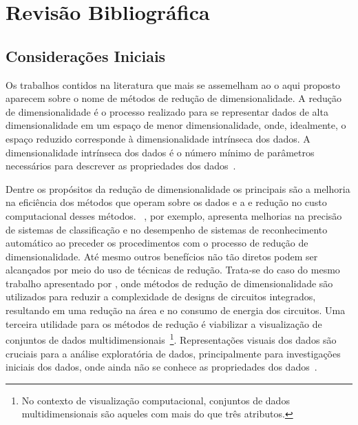 \chapter{Revisão Bibliográfica}\label{chap:revisao}

\section{Considerações Iniciais}


Os trabalhos contidos na literatura que mais se assemelham ao o aqui proposto aparecem sobre o nome de métodos de redução de dimensionalidade. 
A redução de dimensionalidade é o processo realizado para se representar dados de alta dimensionalidade em um espaço de menor dimensionalidade, onde, idealmente, o espaço reduzido corresponde à dimensionalidade intrínseca dos dados. 
A dimensionalidade intrínseca dos dados é o número mínimo de parâmetros necessários para descrever as propriedades dos dados~\cite{Fukunaga1990}.

Dentre os propósitos da redução de dimensionalidade os principais são a melhoria na eficiência dos métodos que operam sobre os dados e a e redução no custo computacional desses métodos.  
\citeauthor{Konig2000}~\cite{Konig2000}, por exemplo, apresenta melhorias na precisão de sistemas de classificação e no desempenho de sistemas de reconhecimento automático ao preceder os procedimentos com o processo de redução de dimensionalidade. 
Até mesmo outros benefícios não tão diretos podem ser alcançados por meio do uso de técnicas de redução. 
Trata-se do caso do mesmo trabalho apresentado por \citeauthor{Konig2000}, onde métodos de redução de dimensionalidade são utilizados para reduzir a complexidade de designs de circuitos integrados, resultando em uma redução na área e no consumo de energia dos circuitos.
Uma terceira utilidade para os métodos de redução é viabilizar a visualização de conjuntos de dados multidimensionais~\footnote{No contexto de visualização computacional, conjuntos de dados multidimensionais são aqueles com mais do que três atributos.}. Representações visuais dos dados são cruciais para a análise exploratória de dados, principalmente para investigações iniciais dos dados, onde ainda não se conhece as propriedades dos dados~\cite{Kaski2011}. 

